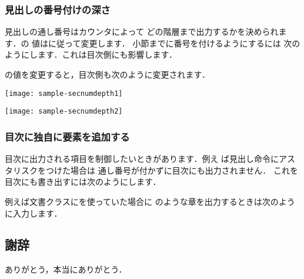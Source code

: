 \subsection{見出しの番号付けの深さ}
\begin{usage}
\setcounter{secnumdepth}{$\<整数値>$}
\end{usage}
%
%
%
%
見出しの通し番号はカウンタによって
どの階層まで出力するかを決められます．の
値はに従って変更します．
小節までに番号を付けるようにするには
次のようにします．これは目次側にも影響します．

の値を変更すると，目次側も次のように変更されます．
\begin{inonly}
\setcounter{secnumdepth}{1}
\end{inonly}
\begin{outonly}
\texttt{[image: sample-secnumdepth1]} 
\end{outonly}


\begin{inonly}
\setcounter{secnumdepth}{2}
\end{inonly}
\begin{outonly}
\texttt{[image: sample-secnumdepth2]} 
\end{outonly}




\subsection{目次に独自に要素を追加する}
目次に出力される項目を制御したいときがあります．例え
ば見出し命令にアスタリスクをつけた場合は
通し番号が付かずに目次にも出力されません．
これを目次にも書き出すには次のようにします．
\begin{usage}
\end{usage}

例えば文書クラスにを使っていた場合に
のような章を出力するときは次のように入力します．

\begin{intext}
\chapter*{謝辞}
ありがとう，本当にありがとう．
\end{intext}

